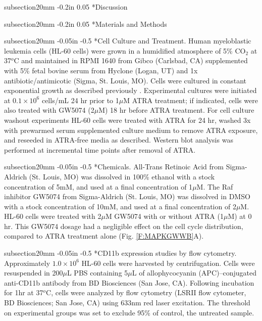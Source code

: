 \documentclass[12pt]{article}
\makeatletter
\renewcommand\subsection{\@startsection
	{subsection}{2}{0mm}
	{-0.05in}
	{-0.5\baselineskip}
	{\normalfont\normalsize\bfseries}}
\renewcommand\section{\@startsection
	{subsection}{2}{0mm}
	{-0.2in}
	{0.05\baselineskip}
	{\normalfont\large\bfseries}}
\makeatother
\begin{document}
\clearpage

\section*{Discussion}

\clearpage

\section*{Materials and Methods}


\subsection*{Cell Culture and Treatment.}
Human myeloblastic leukemia cells (HL-60 cells) were grown in a humidified atmosphere of 5\% CO$_2$ at 37$^{o}$C and maintained in RPMI 1640 from Gibco (Carlsbad, CA) 
supplemented with 5\% fetal bovine serum from Hyclone (Logan, UT) and 1x antibiotic/antimicotic (Sigma, St. Louis, MO).
Cells were cultured in constant exponential growth as described previously \cite{Brooks1996}. 
Experimental cultures were initiated at $0.1\times10^6$ cells/mL 24 hr prior to 1$\mu$M ATRA treatment;
if indicated, cells were also treated with GW5074 (2$\mu$M) 18 hr before ATRA treatment.   
For cell culture washout experiments HL-60 cells were treated with ATRA for 24 hr, 
washed 3x with prewarmed serum supplemented culture medium to remove ATRA exposure, 
and reseeded in ATRA-free media as described. 
Western blot analysis was performed at incremental time points after removal of ATRA.

\subsection*{Chemicals.}
All-Trans Retinoic Acid from Sigma-Aldrich (St. Louis, MO) was dissolved in 100\% ethanol with a stock concentration of 5mM, 
and used at a final concentration of 1$\mu$M.
The Raf inhibitor GW5074 from Sigma-Aldrich (St. Louis, MO) was dissolved in DMSO with a stock concentration of 10mM, 
and used at a final concentration of 2$\mu$M.
HL-60 cells were treated with 2$\mu$M GW5074 with or without ATRA (1$\mu$M) at 0 hr.  
This GW5074 dosage had a negligible effect on the cell cycle distribution, compared to ATRA treatment alone (Fig. \ref{F:MAPKGWWB}A). 

\subsection*{CD11b expression studies by flow cytometry.}
Approximately $1.0\times10^6$ HL-60 cells were harvested  by centrifugation. 
Cells were resuspended in 200$\mu$L PBS containing 5$\mu$L of allophycocyanin (APC)–conjugated anti-CD11b antibody from BD Biosciences (San Jose, CA). 
Following incubation for 1hr at 37$^{o}$C, cells were analyzed by flow cytometry (LSRII flow cytometer, BD Biosciences; San Jose, CA) using 633nm red laser excitation. 
The threshold on experimental groups was set to exclude 95\% of control, the untreated sample. 
\end{document}

